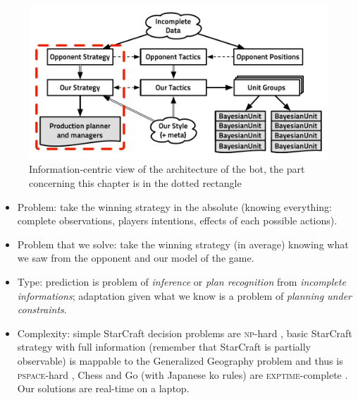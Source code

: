 \begin{figure}[!ht]
\begin{center}
\includegraphics[width=0.84\columnwidth]{images/starcraft_bbq_concept_STRATEGY.pdf}
\end{center}
\caption{Information-centric view of the architecture of the bot, the part concerning this chapter is in the dotted rectangle}
\label{fig:conceptSTRATEGY}
\end{figure}

\begin{itemize}
\item Problem: take the winning strategy in the absolute (knowing everything: complete observations, players intentions, effects of each possible actions).
\item Problem that we solve: take the winning strategy (in average) knowing what we saw from the opponent and our model of the game. 
\item Type: prediction is problem of \textit{inference} or \textit{plan recognition} from \textit{incomplete informations}; adaptation given what we know is a problem of \textit{planning under constraints}.
\item Complexity: simple StarCraft decision problems are \textsc{np}-hard \citep{GamingComplexity}, basic StarCraft strategy with full information (remember that StarCraft is partially observable) is mappable to the Generalized Geography problem and thus is \textsc{pspace}-hard \citep{Lichtenstein78}, Chess \citep{Fraenkel81} and Go (with Japanese ko rules) are \textsc{exptime}-complete \citep{Robson83}. Our solutions are real-time on a laptop. %
\end{itemize}

